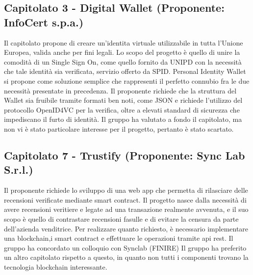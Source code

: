 \documentclass[12pt]{article}
\begin{document}
     
\subsection{Capitolato 3 - Digital Wallet (Proponente: InfoCert s.p.a.)}
    Il capitolato propone di creare un'identita virtuale utilizzabile in tutta l'Unione Europea, valida anche per fini legali. Lo scopo del progetto è quello di unire la comodità di un Single Sign On, come quello fornito da UNIPD con la necessità che tale identità sia verificata, servizio offerto da SPID.
    Personal Identity Wallet si propone come soluzione semplice che rappresenti il perfetto connubio fra le due necessità presentate in precedenza.
    Il proponente richiede che la struttura del Wallet sia fruibile tramite formati ben noti, come JSON e richiede l'utilizzo del protocollo OpenID4VC per la verifica, oltre a elevati standard di sicurezza che impediscano il furto di identità.
    Il gruppo ha valutato a fondo il capitolato, ma non vi è stato particolare interesse per il progetto, pertanto è stato scartato.

\subsection{Capitolato 7 - Trustify (Proponente: Sync Lab S.r.l.)}
    Il proponente richiede lo sviluppo di una web app che permetta di rilasciare delle recensioni verificate mediante smart contract. Il progetto nasce dalla necessità di avere recensioni veritiere e legate ad una transazione realmente avvenuta, e il suo scopo è quello di contrastare recensioni fasulle e di evitare la censura da parte dell'azienda venditrice.
    Per realizzare quanto richiesto, è necessario implementare una blockchain,i smart contract e effettuare le operazioni tramite api rest.
    Il gruppo ha concordato un colloquio con Synclab (FINIRE)
    Il gruppo ha preferito un altro capitolato rispetto a questo, in quanto non tutti i componenti trovano la tecnologia blockchain interessante.
\end{document}
